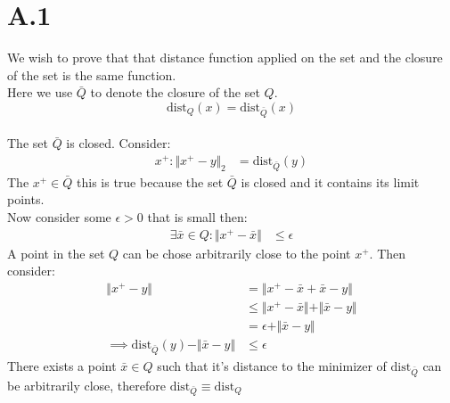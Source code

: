 \documentclass[]{article}
\begin{document}
    \section*{A.1}\label{sec:A.1}
        We wish to prove that that distance function applied on the set and the closure of the set is the same function.
        \\
        Here we use $\bar{Q}$ to denote the closure of the set $Q$. 
        $$
            \text{dist}_Q(x) = \text{dist}_{\bar{Q}}(x)
        $$ 
        \\
        The set $\bar{Q}$ is closed. Consider:
        \begin{align*}\tag{A.1.1}\label{eqn:A.1.1}
            x^+ : \Vert x^+ - y\Vert_2 &= \text{dist}_{\bar{Q}}(y)
        \end{align*}
        The $x^+ \in \bar{Q}$ this is true because the set $\bar{Q}$ is closed and it contains its limit points.
        \\
        Now consider some $\epsilon > 0 $ that is small then: 
        \begin{align*}\tag{A.1.2}\label{eqn:A.1.2}
            \exists \bar{x} \in Q: \Vert x^+ - \bar{x}\Vert 
            &\le \epsilon
        \end{align*}
        A point in the set $Q$ can be chose arbitrarily close to the point $x^+$. Then consider: 
        \begin{align*}\tag{A.1.3}\label{eqn:A.1.3}
            \Vert x^+ - y \Vert &= 
            \Vert x^+ - \bar{x} + \bar{x} - y\Vert
            \\
            & \le \Vert x^+ - \bar{x}\Vert + \Vert \bar{x} - y\Vert
            \\
            &= \epsilon + \Vert \bar{x}- y \Vert
            \\
            \implies 
            \text{dist}_{\bar{Q}}(y) - \Vert \bar{x} - y\Vert & \le \epsilon
        \end{align*}
        There exists a point $\bar{x}\in Q$ such that it's distance to the minimizer of $\text{dist}_{\bar{Q}}$ can be arbitrarily close, therefore $\text{dist}_{\bar{Q}} \equiv \text{dist}_Q$
\end{document}
